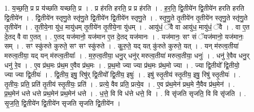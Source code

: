 \documentclass[17pt]{extarticle}
\begin{document}
1. य॒च्छ॒ति॒ प्र प्र य॑च्छति यच्छति॒ प्र । . प्र ह॑रति हरति॒ प्र प्र ह॑रति । . ह॒र॒ति॒ द्वि॒तीये॑न द्वि॒तीये॑न हरति हरति द्वि॒तीये॑न । . द्वि॒तीये॑न स्तृणु॒ते स्तृ॑णु॒ते द्वि॒तीये॑न द्वि॒तीये॑न स्तृणु॒ते । . स्तृ॒णु॒ते तृ॒तीये॑न तृ॒तीये॑न स्तृणु॒ते स्तृ॑णु॒ते तृ॒तीये॑न । . तृ॒तीये॒ना यु॑ध॒ मायु॑धम् तृ॒तीये॑न तृ॒तीये॒ना यु॑धम् । . आयु॑धं॒ ॅवै वा आयु॑ध॒ मायु॑धं॒ ॅवै । . वा ए॒त दे॒तद् वै वा ए॒तत् । . ए॒तद् यज॑मानो॒ यज॑मान ए॒त दे॒तद् यज॑मानः । . यज॑मानः॒ सꣳ सं ॅयज॑मानो॒ यज॑मानः॒ सम् । . सꣳ स्कु॑रुते कुरुते॒ सꣳ सꣳ स्कु॑रुते । . कु॒रु॒ते॒ यद् यत् कु॑रुते कुरुते॒ यत् । . यन् म॑रुत्व॒तीया॑ मरुत्व॒तीया॒ यद् यन् म॑रुत्व॒तीयाः᳚ । . म॒रु॒त्व॒तीया॒ धनु॒र् धनु॑र् मरुत्व॒तीया॑ मरुत्व॒तीया॒ धनुः॑ । . धनु॑ रे॒वैव धनु॒र् धनु॑ रे॒व । . ए॒व प्र॑थ॒मः प्र॑थ॒म ए॒वैव प्र॑थ॒मः । . प्र॒थ॒मो ज्या ज्या प्र॑थ॒मः प्र॑थ॒मो ज्या । . ज्या द्वि॒तीयो᳚ द्वि॒तीयो॒ ज्या ज्या द्वि॒तीयः॑ । . द्वि॒तीय॒ इषु॒ रिषु॑र् द्वि॒तीयो᳚ द्वि॒तीय॒ इषुः॑ । . इषु॑ स्तृ॒तीय॑ स्तृ॒तीय॒ इषु॒ रिषु॑ स्तृ॒तीयः॑ । . तृ॒तीयः॒ प्रति॒ प्रति॑ तृ॒तीय॑ स्तृ॒तीयः॒ प्रति॑ । . प्रत्ये॒ वैव प्रति॒ प्रत्ये॒व । . ए॒व प्र॑थ॒मेन॑ प्रथ॒मे नै॒वैव प्र॑थ॒मेन॑ । . प्र॒थ॒मेन॑ धत्ते धत्ते प्रथ॒मेन॑ प्रथ॒मेन॑ धत्ते । . ध॒त्ते॒ वि वि ध॑त्ते धत्ते॒ वि । . वि सृ॑जति सृजति॒ वि वि सृ॑जति । . सृ॒ज॒ति॒ द्वि॒तीये॑न द्वि॒तीये॑न सृजति सृजति द्वि॒तीये॑न । \newline
\end{document}
